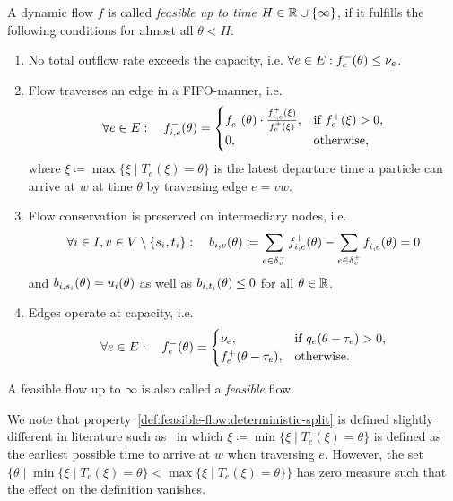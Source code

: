 \begin{definition}\label{def:feasible-flow}
    A dynamic flow $f$ is called \emph{feasible up to time $H\in\mathbb{R} \cup \{\infty \}$}, if it fulfills the following conditions for almost all $\theta < H$:
    \begin{enumerate}[label=(F\arabic*)]
        \item\label{def:feasible-flow:max-capacity} No total outflow rate exceeds the capacity, i.e. $\forall e\in E: {f}^-_e(\theta)\leq \nu_e$.
        \item\label{def:feasible-flow:deterministic-split} Flow traverses an edge in a FIFO-manner, i.e. \[
            \forall e\in E: \quad 
            {f}^-_{i,e}(\theta) = \begin{cases}
                {f}^-_e(\theta) \cdot \frac{{f}^+_{i,e}(\xi)}{{f}^+_e(\xi)}, & \text{if ${f}^+_e(\xi) > 0$,}\\
                0, & \text{otherwise,}
        \end{cases}
        \]
        where $\xi\coloneqq \max \{ \xi  \mid T_e(\xi) = \theta \}$ is the latest departure time a particle can arrive at $w$ at time $\theta$ by traversing edge $e=vw$. 
        \item\label{def:feasible-flow:flow-conservation} Flow conservation is preserved on intermediary nodes, i.e. \[\forall i\in I, v\in V\setminus\{ s_i, t_i \}: \quad
        b_{i,v}(\theta)\coloneqq \sum_{e\in\delta^-_{v}}{f}^+_{i,e}(\theta) - \sum_{e\in\delta^+_{v}} {f}^-_{i,e}(\theta) = 0 \]
        and $b_{i,s_i}(\theta) = u_i(\theta)$ as well as $b_{i,t_i}(\theta) \leq 0$ for all $\theta\in\mathbb{R}$.

        \item\label{def:feasible-flow:operate-at-capacity} Edges operate at capacity, i.e. 
        \[
            \forall e\in E: \quad {f}^-_{e}(\theta) = \begin{cases}
                \nu_e, &\text{if $q_e(\theta - \tau_e)>0$,} \\
                {f}^+_e(\theta-\tau_e), &\text{otherwise.}
            \end{cases}
        \]
    \end{enumerate}
    A feasible flow up to $\infty$ is also called a \emph{feasible} flow.
\end{definition}



\begin{remark}
    We note that property~\ref{def:feasible-flow:deterministic-split} is defined slightly different in literature such as~\cite{Graf2020} in which $\xi\coloneqq \min \{ \xi  \mid T_e(\xi) = \theta \}$ is defined as the earliest possible time to arrive at $w$ when traversing $e$.
    However, the set $\{\theta \mid \min \{ \xi  \mid T_e(\xi) = \theta \} < \max \{ \xi  \mid T_e(\xi) = \theta \} \}$ has zero measure such that the effect on the definition vanishes.
\end{remark}

